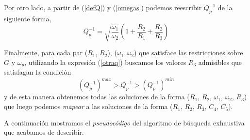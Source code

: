 \documentclass{llncs}
\begin{document}
		Por otro lado, a partir de (\ref{defQ}) y (\ref{omegas}) podemos reescribir $Q_p^{-1}$ de la siguiente forma,
		\begin{equation}
		Q_p^{-1} =
		\sqrt{\frac{\omega_1}{\omega_2}}\left(1+\frac{R_2}{R_1}+\frac{R_2}{R_3}\right)
		\label{otraq}
		\end{equation}
		
		Finalmente, para cada par ($R_1$, $R_2$), ($\omega_1, \omega_2$) que satisface
		las restricciones sobre $G$ y $\omega_p$, utilizando la expresión
		(\ref{otraq}) buscamos los valores $R_3$ admisibles que satisfagan la  condición
		$$
		(Q_p^{-1})^{max} > Q_p^{-1} > (Q_p^{-1})^{min}
		$$
		y de esta manera obtenemos todas las soluciones de la forma ($R_1$, $R_2$,
		$\omega_1$, $\omega_2$, $R_3$)  
		que luego podemos \textit{mapear} a las soluciones de la forma ($R_1$,
		$R_2$, $R_3$, $C_4$, $C_5$). 
		
		A continuación mostramos el \textit{pseudocódigo} del algoritmo de búsqueda exhaustiva que acabamos
		de describir.
		
\end{document}
